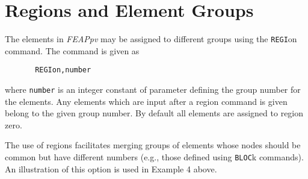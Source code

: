\section{Regions and Element Groups}
\label{regions}

The elements in {\sl FEAPpv} may be assigned to different groups using the
{\tt REGI}\-on command.  The command is given as
\begin{verbatim}
       REGIon,number
\end{verbatim}
where {\tt number} is an integer constant of parameter defining the group
number for the elements.
Any elements which are input after a region command is given belong
to the given group number.
By default all elements are assigned to region zero.

The use of regions facilitates
merging groups of elements whose nodes should be common
but have different numbers (e.g., those defined using {\tt BLOC}k commands).
An illustration of this option is used in Example 4 above.
